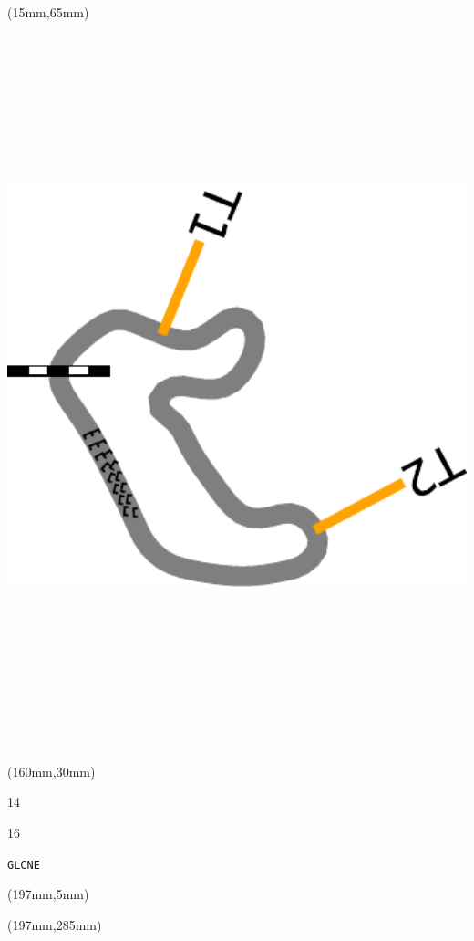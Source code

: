 \begin{textblock*}{185mm}(15mm,65mm)%
\centering
\mbox{\includegraphics[width=185mm,height=210mm,keepaspectratio]{PT/GLCNE.pdf}}
\end{textblock*}
\begin{textblock*}{40mm}(160mm,30mm)%
\Large
\par{} 
\par14 
\par16 
\par\hfill\tiny\tt GLCNE\\
\end{textblock*}
\begin{textblock*}{20mm}(197mm,5mm)%
\fbox{\thepage}
\label{GLCNE}
\end{textblock*}
\begin{textblock*}{20mm}(197mm,285mm)%
\fbox{\thepage}
\end{textblock*}

